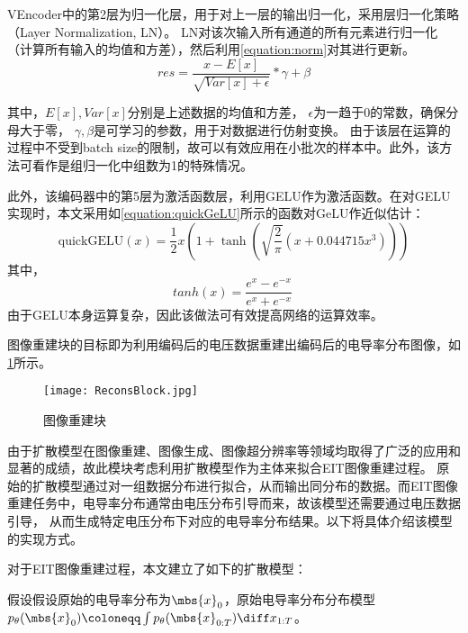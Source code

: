 VEncoder中的第2层为归一化层，用于对上一层的输出归一化，采用层归一化策略（Layer Normalization, LN）。
LN对该次输入所有通道的所有元素进行归一化（计算所有输入的均值和方差），然后利用\cref{equation:norm}对其进行更新。
\begin{equation}
  \label{equation:norm}
  res = \frac{x - E\left[ x\right]}{\sqrt{Var\left[ x\right] + \epsilon}} * \gamma + \beta
\end{equation}

其中，$E\left[ x\right], Var\left[ x\right]$分别是上述数据的均值和方差， $\epsilon$为一趋于0的常数，确保分母大于零，
$\gamma, \beta$是可学习的参数，用于对数据进行仿射变换。
由于该层在运算的过程中不受到batch size的限制，故可以有效应用在小批次的样本中。此外，该方法可看作是组归一化中组数为1的特殊情况。


此外，该编码器中的第5层为激活函数层，利用GELU作为激活函数。在对GELU实现时，本文采用如\cref{equation:quickGeLU}所示的函数对GeLU作近似估计：
  \begin{equation}
    \label{equation:quickGeLU}
    \text{quickGELU}(x) = \frac{1}{2}x\left(1 + \tanh\left(\sqrt{\frac{2}{\pi}}\left(x + 0.044715x^3\right)\right)\right)
  \end{equation}
  其中，
  \begin{equation}
    tanh(x) = \frac{{e^{x} - e^{-x}}}{{e^{x} + e^{-x}}}
\
  \end{equation}
由于GELU本身运算复杂，因此该做法可有效提高网络的运算效率。







图像重建块的目标即为利用编码后的电压数据重建出编码后的电导率分布图像，如\cref{figure:ReconsBlock}所示。
\begin{figure}[h]
    \centering
    \texttt{[image: ReconsBlock.jpg]}
    \caption{图像重建块}
    \label{figure:ReconsBlock}
\end{figure}

由于扩散模型在图像重建、图像生成、图像超分辨率等领域均取得了广泛的应用和显著的成绩，故此模块考虑利用扩散模型作为主体来拟合EIT图像重建过程。
原始的扩散模型通过对一组数据分布进行拟合，从而输出同分布的数据。而EIT图像重建任务中，电导率分布通常由电压分布引导而来，故该模型还需要通过电压数据引导，
从而生成特定电压分布下对应的电导率分布结果。以下将具体介绍该模型的实现方式。

对于EIT图像重建过程，本文建立了如下的扩散模型：

假设假设原始的电导率分布为$\mbs{x}_0$，原始电导率分布分布模型$p_\theta(\mbs{x}_0) \coloneqq \int p_\theta(\mbs{x}_{0:T})\diff x_{1:T}$。


